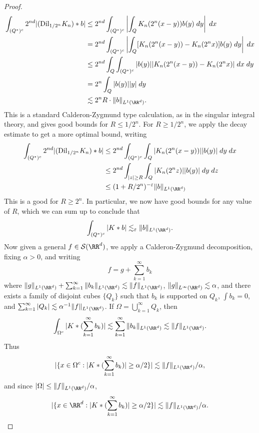 \begin{proof}
  \begin{align*}
    \int_{(Q^*)^c} 2^{nd} |(\text{Dil}_{1/2^n} K_n) * b| &\leq 2^{nd} \int_{(Q^*)^c} \left| \int_Q K_n(2^n(x - y)) b(y)\; dy \right|\; dx\\
    &= 2^{nd} \int_{(Q^*)^c} \left| \int_Q [K_n(2^n(x-y)) - K_n(2^n x)] b(y)\; dy \right|\; dx\\
    &\leq 2^{nd} \int_Q \int_{(Q^*)^c} |b(y)| |K_n(2^n(x-y)) - K_n(2^n x)|\; dx\; dy\\
    &= 2^n \int_Q |b(y)| |y|\; dy\\
    &\lesssim 2^n R \cdot \| b \|_{L^1(\RR^d)}.
  \end{align*}
  This is a standard Calderon-Zygmund type calculation, as in the singular integral theory, and gives good bounds for $R \leq 1/2^n$. For $R \geq 1/2^n$, we apply the decay estimate to get a more optimal bound, writing
  \begin{align*}
    \int_{(Q^*)^c} 2^{nd} |(\text{Dil}_{1/2^n} K_n) * b| &\leq 2^{nd} \int_{(Q^*)^c} \int_Q |K_n(2^n(x - y))| |b(y)|\; dy\; dx\\
        &\leq 2^{nd} \int_{|z| \geq R} \int_Q |K_n(2^n z)| |b(y)|\; dy\; dz\\
        &\leq (1 + R/2^n)^{-\varepsilon} \| b \|_{L^1(\RR^d)}
  \end{align*}
  This is a good for $R \geq 2^n$. In particular, we now have good bounds for any value of $R$, which we can sum up to conclude that
  \[ \int_{(Q^*)^c} |K * b| \lesssim_\varepsilon \| b \|_{L^1(\RR^d)}. \]
  Now given a general $f \in \mathcal{S}(\RR^d)$, we apply a Calderon-Zygmund decomposition, fixing $\alpha > 0$, and writing
  \[ f = g + \sum_{k = 1}^\infty b_k \]
  where $\| g \|_{L^1(\RR^d)} + \sum_{k = 1}^\infty \| b_k \|_{L^1(\RR^d)} \lesssim \| f \|_{L^1(\RR^d)}$, $\| g \|_{L^\infty(\RR^d)} \lesssim \alpha$, and there exists a family of disjoint cubes $\{ Q_k \}$ such that $b_k$ is supported on $Q_k$, $\int b_k = 0$, and $\sum_{k = 1}^\infty |Q_k| \lesssim \alpha^{-1} \| f \|_{L^1(\RR^d)}$. If $\Omega = \bigcup_{k = 1}^\infty Q_k$, then
  \[ \int_{\Omega^c} |K * (\sum_{k = 1}^\infty b_k)| \lesssim \sum_{k = 1}^\infty \| b_k \|_{L^1(\RR^d)} \lesssim \| f \|_{L^1(\RR^d)}. \]
  Thus
  \[ |\{ x \in \Omega^c : |K * (\sum_{k = 1}^\infty b_k)| \geq \alpha/2 \}| \lesssim \| f \|_{L^1(\RR^d)} / \alpha, \]
  and since $|\Omega| \leq \| f \|_{L^1(\RR^d)} / \alpha$,
  \[ |\{ x \in \RR^d : |K * (\sum_{k = 1}^\infty b_k)| \geq \alpha/2 \}| \lesssim \| f \|_{L^1(\RR^d)} / \alpha. \]

\end{proof}
